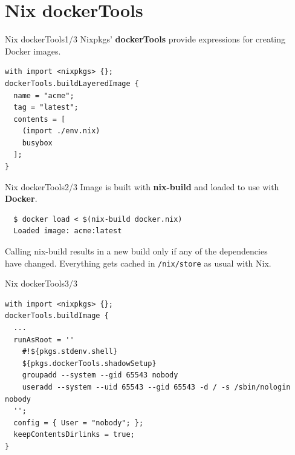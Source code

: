 \documentclass[10pt,aspectratio=169]{beamer}
\begin{document}

\section{Nix dockerTools}


\begin{frame}[fragile]{Nix dockerTools\hfill1/3}
  Nixpkgs' \textbf{dockerTools} provide expressions for creating Docker images.
  \begin{verbatim}
with import <nixpkgs> {};
dockerTools.buildLayeredImage {
  name = "acme";
  tag = "latest";
  contents = [
    (import ./env.nix)
    busybox
  ];
}
  \end{verbatim}
\end{frame}


\begin{frame}[fragile]{Nix dockerTools\hfill2/3}
  Image is built with \textbf{nix-build} and loaded to use with \textbf{Docker}.
  \par
  \vspace{0.5cm}
  \begin{verbatim}
  $ docker load < $(nix-build docker.nix)
  Loaded image: acme:latest
  \end{verbatim}
  \par
  \vspace{0.5cm}
  Calling nix-build results in a new build only if any of the dependencies\\have changed. Everything gets cached in \texttt{/nix/store} as usual with Nix.
\end{frame}


\begin{frame}[fragile]{Nix dockerTools\hfill3/3}
  \begin{verbatim}
with import <nixpkgs> {};
dockerTools.buildImage {
  ...
  runAsRoot = ''
    #!${pkgs.stdenv.shell}
    ${pkgs.dockerTools.shadowSetup}
    groupadd --system --gid 65543 nobody
    useradd --system --uid 65543 --gid 65543 -d / -s /sbin/nologin nobody
  '';
  config = { User = "nobody"; };
  keepContentsDirlinks = true;
}
  \end{verbatim}
\end{frame}
\end{document}
